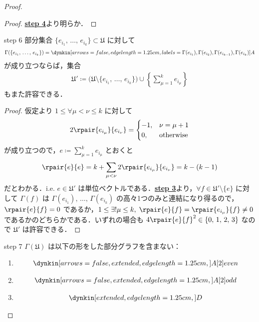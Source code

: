 \documentclass[rep_main]{subfiles}
\begin{document}
\begin{proof}
	\begin{proof}
		\hyperref[lem:classification-step-4]{\textsf{\textbf{step 4}}}より明らか．
	\end{proof}

	\begin{mylem}[label=lem:classification-step-6]{step 6}
		部分集合 $\{e_{i_1},\, \dots,\, e_{i_k}\} \subset \mathfrak{U}$ に対して
		\begin{align}
			\Gamma(\{e_{i_1},\, \dots,\, e_{i_k}\}) = \dynkin[arrows=false,edge length=1.25cm,labels={\Gamma(e_{i_1}),\Gamma(e_{i_2}),\Gamma(e_{i_{k-1}}),\Gamma(e_{i_k})}] A{}
		\end{align}
		が成り立つならば，集合
		\begin{align}
			\mathfrak{U}' \coloneqq \bigl(\mathfrak{U} \setminus \{e_{i_1},\, \dots,\, e_{i_k}\}\bigr) \cup \left\{ \sum_{\mu=1}^k e_{i_\mu} \right\} 
		\end{align}
		もまた許容できる．
	\end{mylem}
	
	\begin{proof}
		仮定より $1 \le \forall \mu < \nu \le k$ に対して
		\begin{align}
			2\rpair{e_{i_\mu}}{e_{i_\nu}}
			=
			\begin{cases}
				-1, &\nu = \mu+1 \\
				0, &\mathrm{otherwise}
			\end{cases}
		\end{align}
		が成り立つので，$e \coloneqq \sum_{\mu=1}^k e_{i_\mu}$ とおくと
		\begin{align}
			\rpair{e}{e} = k + \sum_{\mu < \nu} 2 \rpair{e_{i_\mu}}{e_{i_\nu}} = k - (k - 1)
		\end{align}
		だとわかる．i.e. $e \in \mathfrak{U}'$ は単位ベクトルである．\hyperref[lem:classification-step-3]{\textsf{\textbf{step 3}}}より，$\forall f \in \mathfrak{U}' \setminus \{e\}$ に対して $\Gamma(f)$ は $\Gamma(e_{i_1}),\, \dots,\,\Gamma(e_{i_k})$ の高々1つのみと連結になり得るので，
		$\rpair{e}{f} = 0$ であるか，$1 \le \exists ! \mu \le k,\; \rpair{e}{f} = \rpair{e_{i_\mu}}{f} \neq 0$ であるかのどちらかである．いずれの場合も $4\rpair{e}{f}^2 \in \{0,\, 1,\, 2,\, 3\}$ なので $\mathfrak{U}'$ は許容できる．
	\end{proof}


	\begin{mylem}[label=lem:classification-step-7]{step 7}
		$\Gamma(\mathfrak{U})$ は以下の形をした部分グラフを含まない：
		\begin{enumerate}
			\item 
			\begin{align}
				\dynkin[arrows=false,extended,edge length=1.25cm,] A[2]{even}
			\end{align}
			\item 
			\begin{align}
				\dynkin[arrows=false,extended,edge length=1.25cm,] A[2]{odd}
			\end{align}
			\item \begin{align}
				\dynkin [extended,edge length=1.25cm,] D{}
			\end{align}
			

\end{enumerate}
\end{mylem}
\end{proof}
\end{document}
